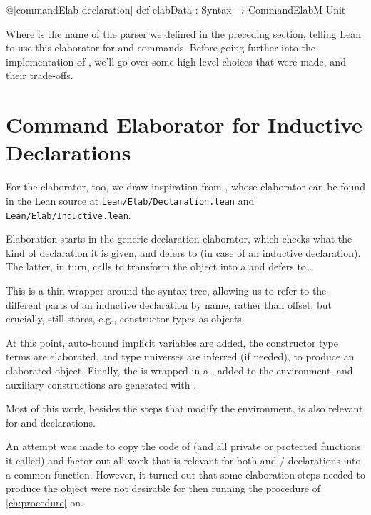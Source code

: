 \begin{leancode}
  @[commandElab declaration] def elabData : Syntax → CommandElabM Unit
\end{leancode}

Where  is the name of the parser we defined in the preceding section, telling Lean
to use this elaborator for \data{} and \codata{} commands.
Before going further into the implementation of , we'll go over some high-level choices 
that were made, and their trade-offs.


\section{Command Elaborator for Inductive Declarations}
For the elaborator, too, we draw inspiration from \inductive{}, whose elaborator can be found in the Lean source at \texttt{Lean/Elab/Declaration.lean} and \texttt{Lean/Elab/Inductive.lean}.

Elaboration starts in the generic declaration elaborator, which checks what the kind of declaration it is given, and defers to  (in case of an inductive declaration). The latter, in turn, calls  to transform the  object into a  and defers to .

This  is a thin wrapper around the syntax tree, allowing us to refer to the different parts of an inductive declaration by name, rather than offset, but crucially, still stores, e.g., constructor types as  objects.

At this point, auto-bound implicit variables are added, the constructor type terms are elaborated, and type universes are inferred (if needed), to produce an elaborated  object. 
Finally, the  is wrapped in a , added to the environment, and auxiliary constructions are generated with .


Most of this work, besides the steps that modify the environment, is also relevant for \data{} and \codata{} declarations.

An attempt was made to copy the code of  (and all private or protected functions it called) and factor out all work that is relevant for both \inductive{} and \data{}/\codata{} declarations into a common function.
However, it turned out that some elaboration steps needed to produce the  object were not desirable for then running the procedure of \cref{ch:procedure} on.

